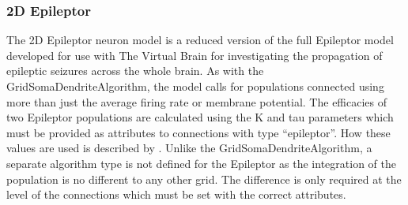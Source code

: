 \documentclass[utf8]{frontiers_suppmat} %
\begin{document}
\subsubsection{2D Epileptor}
The 2D Epileptor neuron model \citep{proix2014permittivity,proix2017individual} is a reduced version of the full Epileptor model \citep{jirsa2014nature} developed for use with The Virtual Brain for investigating the propagation of epileptic seizures across the whole brain. As with the GridSomaDendriteAlgorithm, the model calls for populations connected using more than just the average firing rate or membrane potential. The efficacies of two Epileptor populations are calculated using the K and tau parameters which must be provided as attributes to connections with type ``epileptor''. How these values are used is described by \cite{proix2014permittivity}. Unlike the GridSomaDendriteAlgorithm, a separate algorithm type is not defined for the Epileptor as the integration of the population is no different to any other grid. The difference is only required at the level of the connections which must be set with the correct attributes.
\end{document}
